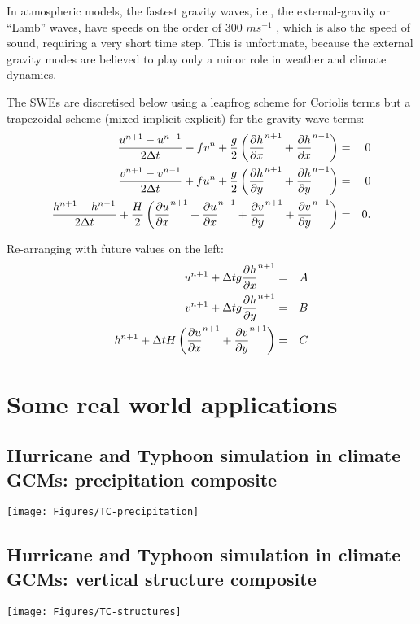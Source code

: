	In atmospheric models, the fastest gravity waves, i.e., the external-gravity or “Lamb” waves, have speeds on the order of 300 $m s^{-1}$ , which is also the speed of sound, requiring a very short time step. This is unfortunate, because the external gravity modes are believed to play only a minor role in weather and climate dynamics. 
	
The SWEs are discretised below
using a leapfrog scheme for Coriolis terms but a
trapezoidal scheme (mixed implicit-explicit) for the gravity wave
terms:
\begin{eqnarray*}
	\frac{u^{n+1}-u^{n-1}}{2\Delta t}-fv^n+\frac{g}{2}
	\left( \frac{\partial h}{\partial x}^{n+1} +\frac{\partial h}{\partial x}^{n-1} \right) & = & 0 \\
	\frac{v^{n+1}-v^{n-1}}{2\Delta t}+fu^n+\frac{g}{2}
	\left( \frac{\partial h}{\partial y}^{n+1} +\frac{\partial h}{\partial y}^{n-1} \right) & = & 0 \\
	\frac{h^{n+1}-h^{n-1}}{2\Delta t}+\frac{H}{2}
	\left( \frac{\partial u}{\partial x}^{n+1} +\frac{\partial u}{\partial x}^{n-1}
	+\frac{\partial v}{\partial y}^{n+1} +\frac{\partial v}{\partial y}^{n-1} 
	\right) & = & 0. 
\end{eqnarray*}

Re-arranging with future values on the left:
\begin{eqnarray*}
	u^{n+1}+\Delta t g \frac{\partial h}{\partial x}^{n+1} & = & A \\
	v^{n+1}+\Delta t g \frac{\partial h}{\partial y}^{n+1} & = & B \\
	h^{n+1}+\Delta t H \left( \frac{\partial u}{\partial x}^{n+1}+\frac{\partial v}{\partial y}^{n+1} \right) & = & C
\end{eqnarray*}
	


\section{Some real world applications}
\subsection{Hurricane and Typhoon simulation in climate GCMs: precipitation composite}

	\begin{center}	
		\texttt{[image: Figures/TC-precipitation]}
	\end{center}
	


\subsection{Hurricane and Typhoon simulation in climate GCMs: vertical structure composite}
	\begin{center}	
		\texttt{[image: Figures/TC-structures]}
	\end{center}
	

